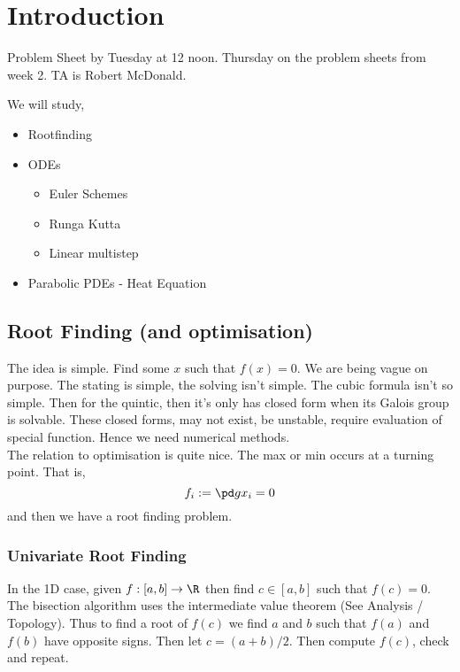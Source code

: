 
\section{Introduction}

Problem Sheet by Tuesday at 12 noon. Thursday on the problem sheets from week 2. TA is Robert McDonald.

\noindent
We will study,
\begin{itemize}
  \item Rootfinding
  \item ODEs
  \begin{itemize}
    \item Euler Schemes
    \item Runga Kutta
    \item Linear multistep
  \end{itemize}
  \item Parabolic PDEs - Heat Equation
\end{itemize}

\subsection{Root Finding (and optimisation)}
The idea is simple. Find some $x$ such that $f(x) = 0$. We are being vague on purpose. The stating is simple, the solving isn't simple. The cubic formula isn't so simple. Then for the quintic, then it's only has closed form when its Galois group is solvable. These closed forms, may not exist, be unstable, require evaluation of special function. Hence we need numerical methods.\\

\noindent
The relation to optimisation is quite nice. The max or min occurs at a turning point. That is,
$$ f_i := \pd g {x_i} = 0 $$
and then we have a root finding problem.

\subsubsection{Univariate Root Finding}
In the 1D case, given $f: [a, b] \to \R$ then find $c \in [a, b]$ such that $f(c) =0$. The bisection algorithm uses the intermediate value theorem (See Analysis / Topology). Thus to find a root of $f(c)$ we find $a$ and $b$ such that $f(a)$ and $f(b)$ have opposite signs. Then let $c = (a + b)/2$. Then compute $f(c)$, check and repeat. \\

